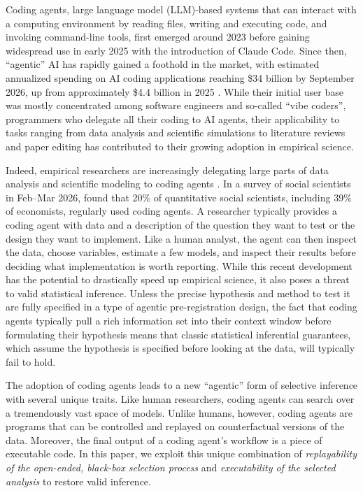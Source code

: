 \documentclass[10pt]{article}
\begin{document}
Coding agents, large language model (LLM)-based systems that can interact with a computing environment by reading files, writing and executing code, and invoking command-line tools, first emerged around 2023 \citep{lucas2023openinterpreter} before gaining widespread use in early 2025 \citep{anthropic2025claudecode} with the introduction of Claude Code. Since then, ``agentic'' AI has rapidly gained a foothold in the market, with estimated annualized spending on AI coding applications reaching \$34 billion by September 2026, up from approximately \$4.4 billion in 2025 \citep{menloventures2026enterprise}. While their initial user base was mostly concentrated among software engineers and so-called ``vibe coders'', programmers who delegate all their coding to AI agents, their applicability to tasks ranging from data analysis and scientific simulations to literature reviews and paper editing has contributed to their growing adoption in empirical science.

Indeed, empirical researchers are increasingly delegating large parts of data analysis and scientific modeling to coding agents \citep{codreanu2026ai, hermle2026AIScience, openaiecon2026codex}. In a survey of social scientists in Feb--Mar 2026, \citet{lyttelton2026agents} found that 20\% of quantitative social scientists, including 39\% of economists, regularly used coding agents. A researcher typically provides a coding agent with data and a description of the question they want to test or the design they want to implement. Like a human analyst, the agent can then inspect the data, choose variables, estimate a few models, and inspect their results before deciding what implementation is worth reporting. While this recent development has the potential to drastically speed up empirical science, it also poses a threat to valid statistical inference. Unless the precise hypothesis and method to test it are fully specified in a type of agentic pre-registration design, the fact that coding agents typically pull a rich information set into their context window before formulating their hypothesis means that classic statistical inferential guarantees, which assume the hypothesis is specified before looking at the data, will typically fail to hold.

The adoption of coding agents leads to a new ``agentic'' form of selective inference with several unique traits. Like human researchers, coding agents can search over a tremendously vast space of models. Unlike humans, however, coding agents are programs that can be controlled and replayed on counterfactual versions of the data. Moreover, the final output of a coding agent's workflow is a piece of executable code. In this paper, we exploit this unique combination of \textit{replayability of the open-ended, black-box selection process} and \textit{executability of the selected analysis} to restore valid inference.
\end{document}
